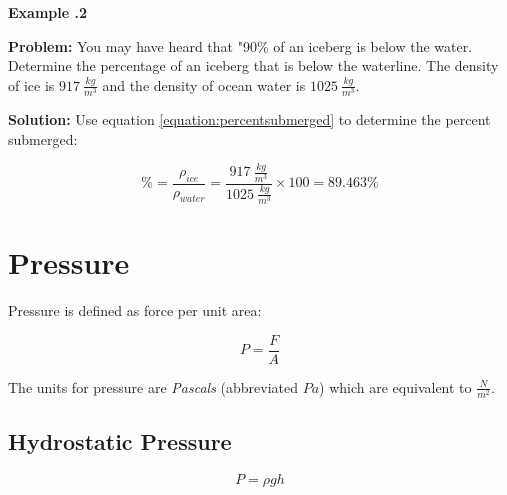 	\begin{mdframed}[backgroundcolor=blue!10!white]
		\begin{center}
			
			
			\textbf{Example \thesection.2}	
		\end{center}
		
		\textbf{Problem: } You may have heard that "90\% of an iceberg is below the water.  Determine the percentage of an iceberg that is below the waterline.  The density of ice is $\SI{917}{\frac{kg}{m^3}}$ and the density of ocean water is $\SI{1025}{\frac{kg}{m^3}}$.
		\vspace{0.1in}
		
		\textbf{Solution:} Use equation \ref{equation:percentsubmerged} to determine the percent submerged:  
	

		
		\begin{equation*}
		\% = \frac{\rho_{ice}}{\rho_{water}} = \frac{\SI{917}{\frac{kg}{m^3}}}{\SI{1025}{\frac{kg}{m^3}}} \times 100 = 89.463\%
		\end{equation*}
		
	\end{mdframed}
	\vspace{0.1in}
	
	
	
	\section{Pressure}
	Pressure is defined as force per unit area: 
	
			\begin{mdframed}[backgroundcolor=orange!20!white]
		\begin{equation}
			P = \frac{F}{A}
			\label{equation:pressure}
		\end{equation}
	\end{mdframed}	

The units for pressure are \textit{Pascals} (abbreviated $\si{Pa}$) which are equivalent to $\si{\frac{N}{m^2}}$.


		\subsection{Hydrostatic Pressure}

				\begin{mdframed}[backgroundcolor=orange!20!white]
		\begin{equation}
			P = \rho g h
			\label{equation:hydrostaticpressure}
		\end{equation}
	\end{mdframed}	

